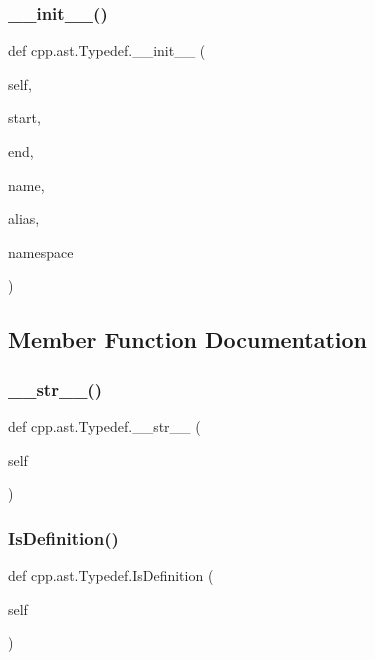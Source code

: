 \subsubsection{\texorpdfstring{\+\_\+\+\_\+init\+\_\+\+\_\+()}{\_\_init\_\_()}}
{\footnotesize\ttfamily def cpp.\+ast.\+Typedef.\+\_\+\+\_\+init\+\_\+\+\_\+ (\begin{DoxyParamCaption}\item[{}]{self,  }\item[{}]{start,  }\item[{}]{end,  }\item[{}]{name,  }\item[{}]{alias,  }\item[{}]{namespace }\end{DoxyParamCaption})}



\subsection{Member Function Documentation}
\mbox{\label{classcpp_1_1ast_1_1_typedef_a451920900affc5f12e38ab8fbf5e3dea}} 
\subsubsection{\texorpdfstring{\+\_\+\+\_\+str\+\_\+\+\_\+()}{\_\_str\_\_()}}
{\footnotesize\ttfamily def cpp.\+ast.\+Typedef.\+\_\+\+\_\+str\+\_\+\+\_\+ (\begin{DoxyParamCaption}\item[{}]{self }\end{DoxyParamCaption})}

\mbox{\label{classcpp_1_1ast_1_1_typedef_a103bf391e665884bfbfd20fc5e6d1a19}} 
\subsubsection{\texorpdfstring{Is\+Definition()}{IsDefinition()}}
{\footnotesize\ttfamily def cpp.\+ast.\+Typedef.\+Is\+Definition (\begin{DoxyParamCaption}\item[{}]{self }\end{DoxyParamCaption})}

